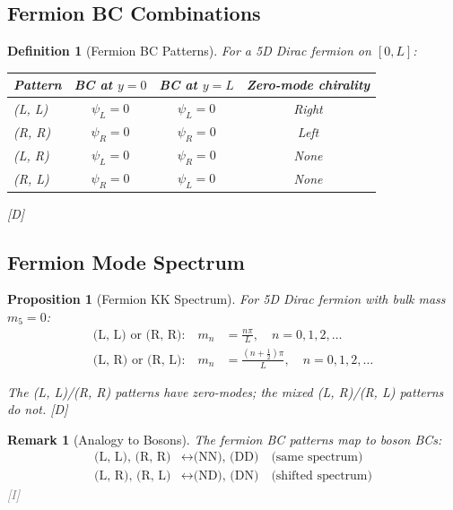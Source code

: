 \documentclass[11pt,a4paper]{article}
\newtheorem{proposition}[theorem]{Proposition}
\newtheorem{definition}[theorem]{Definition}
\newtheorem{remark}[theorem]{Remark}
\newcommand{\tagD}{\textcolor{blue!70!black}{[D]}}
\newcommand{\tagI}{\textcolor{gray}{[I]}}
\begin{document}
\subsection{Fermion BC Combinations}

\begin{definition}[Fermion BC Patterns]
\label{def:ferm-patterns}
For a 5D Dirac fermion on $[0, L]$:
\begin{center}
\begin{tabular}{lccc}
\toprule
Pattern & BC at $y=0$ & BC at $y=L$ & Zero-mode chirality \\
\midrule
(L, L) & $\psi_L = 0$ & $\psi_L = 0$ & Right \\
(R, R) & $\psi_R = 0$ & $\psi_R = 0$ & Left \\
(L, R) & $\psi_L = 0$ & $\psi_R = 0$ & None \\
(R, L) & $\psi_R = 0$ & $\psi_L = 0$ & None \\
\bottomrule
\end{tabular}
\end{center}
\tagD
\end{definition}

\subsection{Fermion Mode Spectrum}

\begin{proposition}[Fermion KK Spectrum]
\label{prop:ferm-spectrum}
For 5D Dirac fermion with bulk mass $m_5 = 0$:
\begin{align}
\label{eq:ferm-LL}
\text{(L, L) or (R, R):} \quad m_n &= \frac{n\pi}{L}, \quad n = 0, 1, 2, \ldots \\
\label{eq:ferm-LR}
\text{(L, R) or (R, L):} \quad m_n &= \frac{(n + \tfrac{1}{2})\pi}{L}, \quad n = 0, 1, 2, \ldots
\end{align}

The (L, L)/(R, R) patterns have zero-modes; the mixed (L, R)/(R, L) patterns do not.
\tagD
\end{proposition}

\begin{remark}[Analogy to Bosons]
The fermion BC patterns map to boson BCs:
\begin{align}
\label{eq:ferm-boson-map-1}
\text{(L, L), (R, R)} &\leftrightarrow \text{(NN), (DD)} \quad \text{(same spectrum)} \\
\label{eq:ferm-boson-map-2}
\text{(L, R), (R, L)} &\leftrightarrow \text{(ND), (DN)} \quad \text{(shifted spectrum)}
\end{align}
\tagI
\end{remark}
\end{document}
